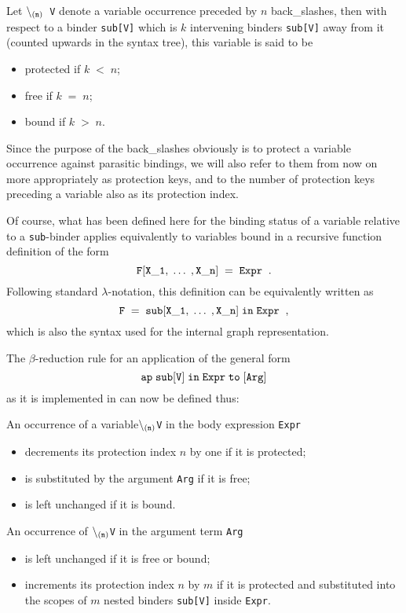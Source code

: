 Let {\tt $\setminus_{\tt (n)}$ V} denote a variable occurrence preceded
by $n$ back\_slashes,  then with respect to a binder {\tt sub[V]} which is $k$
intervening binders {\tt sub[V]} away from it
(counted upwards in the syntax tree), this variable is said to be
\begin{itemize}
\item {\mys protected} if $k\;<\; n$;
\item {\mys free} if $k\;=\;n$;
\item {\mys bound} if $k\;>\;n$.
\end{itemize}
 
Since the purpose of the back\_slashes obviously is to protect a
variable occurrence against parasitic bindings, we will also refer to
them from now on more appropriately as {\mys protection keys}, and
to the number of protection keys preceding a variable also as
its {\mys protection index}.

Of course, what has been defined here for the binding status of
a variable relative to a {\tt sub}-binder applies equivalently to
variables bound in a recursive function definition of the form
$$
{\tt F[X\_1,\;\ldots\;,X\_n]\;=\;Expr}\;\;.
$$
Following standard $\lambda$-notation, this definition can be equivalently 
written as
$$
{\tt F\;=\;sub[X\_1,\;\ldots\;,X\_n]\;in\;Expr}\;\;,
$$
which is also the syntax used for the internal graph representation.
 
The {\mys $\beta$-reduction} rule for an application of the general form
$$
{\tt ap\;sub[V]\;in\;Expr\;to\;[Arg]}
$$
as it is implemented in \pired can now be defined thus:

An occurrence of a variable{\tt $\setminus_{\tt (n)}$V} in the body expression
{\tt Expr}
\begin{itemize}
\item decrements its protection index $n$ by one if it is protected;
\item is substituted by the argument {\tt Arg} if it is free;
\item is left unchanged if it is bound.
\end{itemize}
An occurrence of {\tt $\setminus_{\tt (n)}$V} in the argument term {\tt Arg}
\begin{itemize}
\item is left unchanged if it is free or bound;
\item increments its protection index $n$ by $m$ if it is
protected and substituted into
the scopes of $m$ nested binders {\tt sub[V]} inside {\tt Expr}.
\end{itemize}


